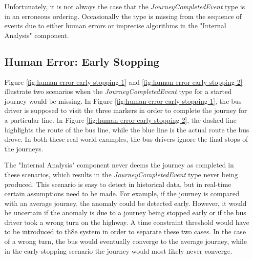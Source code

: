 Unfortunately, it is not always the case that the \textit{JourneyCompletedEvent} type is in an erroneous ordering.
Occasionally the type is missing from the sequence of events due to either human errors or imprecise algorithms in the "Internal Analysis" component.

\subsection{Human Error: Early Stopping}
Figure \ref{fig:human-error-early-stopping-1} and \ref{fig:human-error-early-stopping-2} illustrate two scenarios when the \textit{JourneyCompletedEvent} type for a started journey would be missing.
In Figure \ref{fig:human-error-early-stopping-1}, the bus driver is supposed to visit the three markers in order to complete the journey for a particular line.
In Figure \ref{fig:human-error-early-stopping-2}, the dashed line highlights the route of the bus line, while the blue line is the actual route the bus drove.
In both these real-world examples, the bus drivers ignore the final stops of the journeys.

The "Internal Analysis" component never deems the journey as completed in these scenarios, which results in the \textit{JourneyCompletedEvent} type never being produced.
This scenario is easy to detect in historical data, but in real-time certain assumptions need to be made.
For example, if the journey is compared with an average journey, the anomaly could be detected early.
However, it would be uncertain if the anomaly is due to a journey being stopped early or if the bus driver took a wrong turn on the highway.
A time constraint threshold would have to be introduced to th8e system in order to separate these two cases.
In the case of a wrong turn, the bus would eventually converge to the average journey, while in the early-stopping scenario the journey would most likely never converge.

